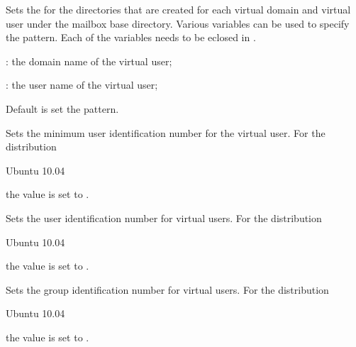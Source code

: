 
Sets the  for the directories that are created for each virtual
domain and virtual user under the mailbox base directory. 
Various variables can be used to specify the pattern.
Each of the variables needs to be eclosed in \qcode{\$\{\}}.
\begin{compactitem}
\item[\qcode{domain}:] the domain name of the virtual user;
\item[\qcode{user}:] the user name of the virtual user;
\end{compactitem}
Default is set the  pattern.


Sets the minimum user identification number  for the virtual user.
For the distribution
\begin{inparaitem}
\item[\TheDistribution{ubuntu}] Ubuntu 10.04
\end{inparaitem}
the value is set to .


Sets the user identification number  for virtual users.
For the distribution
\begin{inparaitem}
\item[\TheDistribution{ubuntu}] Ubuntu 10.04
\end{inparaitem}
the value is set to .


Sets the group identification number  for virtual users.
For the distribution
\begin{inparaitem}
\item[\TheDistribution{ubuntu}] Ubuntu 10.04
\end{inparaitem}
the value is set to .

